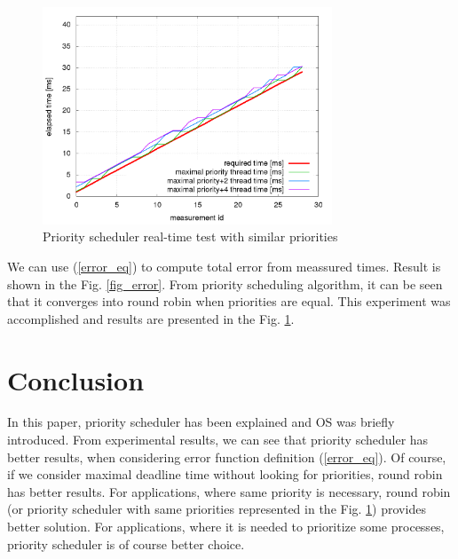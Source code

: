 \documentclass[a4paper, conference]{IEEEtran}
\begin{document}
\begin{figure}[H]
\centering
\includegraphics[width=3.4in]{priority_scheduler_similar_priority.png}
\caption{Priority scheduler real-time test with similar priorities}
\label{fig_priority_scheduler_similar_priority}
\end{figure}


We can use (\ref{error_eq}) to compute total error from meassured times. Result is shown in the Fig. \ref{fig_error}. From priority scheduling algorithm, it can be seen that it converges into round robin when priorities are equal. This experiment was accomplished and results are presented in the Fig. \ref{fig_priority_scheduler_similar_priority}.



\section{Conclusion}
In this paper, priority scheduler has been explained and OS was briefly introduced. From experimental results, we can see that priority scheduler has better results, when considering error function definition (\ref{error_eq}). Of course, if we consider maximal deadline time without looking for priorities, round robin has better results. For applications, where same priority is necessary, round robin (or priority scheduler with same priorities represented in the Fig. \ref{fig_priority_scheduler_similar_priority}) provides better solution. For applications, where it is needed to prioritize some processes, priority scheduler is of course better choice.



\balance
\end{document}
